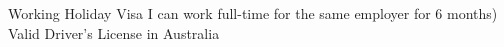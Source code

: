 

\begin{cvskills}
  \cvskill
    {Working Holiday Visa} %
    {I can work full-time for the same employer for 6 months)}
  \cvskill
    {Valid Driver's License in Australia} %
    {} %


\end{cvskills}
